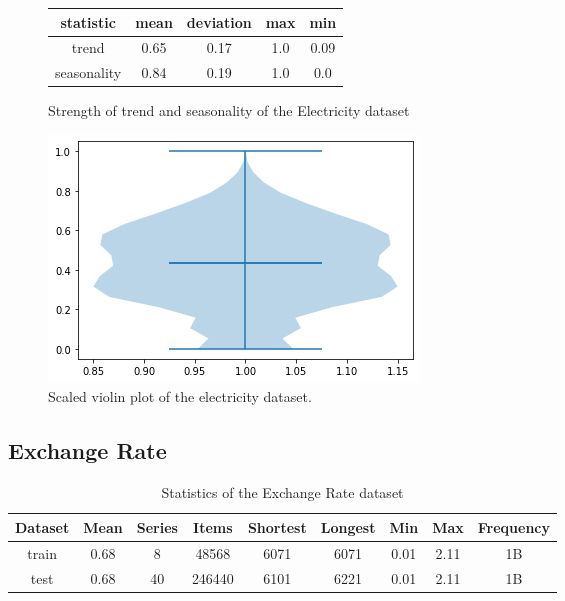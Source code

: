 \begin{figure}[htb]
  \centering
  \begin{center}
    \begin{tabular}{||c | c | c | c | c |}
      \hline
      statistic   & mean & deviation & max & min  \\
      \hline
      trend       & 0.65 & 0.17      & 1.0 & 0.09 \\
      \hline
      seasonality & 0.84 & 0.19      & 1.0 & 0.0  \\
      \hline
      \hline
    \end{tabular}
    \caption{Strength of trend and seasonality of the Electricity dataset}
  \end{center}
  \endminipage\hfill
  \includegraphics[width=\linewidth]{./img/electricity_violin.png}
  \caption{Scaled violin plot of the electricity dataset.}
  \label{fig:electricity_violin}
  \endminipage\hfill
\end{figure}

\clearpage
\subsection{Exchange Rate}

\begin{table}[htb]
  \begin{tabular}{||c | c c c c c c c c ||}
    \hline
    Dataset & Mean & Series & Items  & Shortest & Longest & Min  & Max  & Frequency \\ [0.5ex]
    \hline\hline
    train   & 0.68 & 8      & 48568  & 6071     & 6071    & 0.01 & 2.11 & 1B        \\
    \hline
    test    & 0.68 & 40     & 246440 & 6101     & 6221    & 0.01 & 2.11 & 1B        \\
    \hline
  \end{tabular}
  \caption{Statistics of the Exchange Rate dataset}
\end{table}


